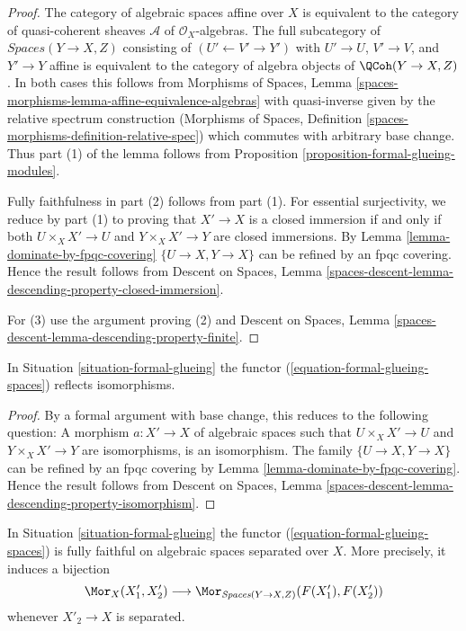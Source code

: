 \begin{proof}
The category of algebraic spaces affine over $X$ is equivalent to the
category of quasi-coherent sheaves $\mathcal{A}$ of $\mathcal{O}_X$-algebras.
The full subcategory of $\textit{Spaces}(Y \to X, Z)$ consisting of
$(U' \leftarrow V' \rightarrow Y')$ with $U' \to U$, $V' \to V$,
and $Y' \to Y$ affine is equivalent to the category of
algebra objects of $\QCoh(Y \to X, Z)$. In both cases this follows
from Morphisms of Spaces, Lemma
\ref{spaces-morphisms-lemma-affine-equivalence-algebras}
with quasi-inverse given by the relative spectrum construction
(Morphisms of Spaces, Definition
\ref{spaces-morphisms-definition-relative-spec})
which commutes with arbitrary base change. Thus part (1) of the
lemma follows from Proposition \ref{proposition-formal-glueing-modules}.

\medskip\noindent
Fully faithfulness in part (2) follows from part (1). For essential
surjectivity, we reduce by part (1) to proving that $X' \to X$
is a closed immersion if and only if both $U \times_X X' \to U$ and
$Y \times_X X' \to Y$ are closed immersions. By
Lemma \ref{lemma-dominate-by-fpqc-covering}
$\{U \to X, Y \to X\}$ can be refined by an fpqc covering.
Hence the result follows from
Descent on Spaces, Lemma
\ref{spaces-descent-lemma-descending-property-closed-immersion}.

\medskip\noindent
For (3) use the argument proving (2) and
Descent on Spaces, Lemma
\ref{spaces-descent-lemma-descending-property-finite}.
\end{proof}

\begin{lemma}
\label{lemma-reflects-isomorphisms}
In Situation \ref{situation-formal-glueing} the functor
(\ref{equation-formal-glueing-spaces}) reflects isomorphisms.
\end{lemma}

\begin{proof}
By a formal argument with base change, this reduces to the following
question: A morphism $a : X' \to X$ of algebraic spaces such that
$U \times_X X' \to U$ and $Y \times_X X' \to Y$ are isomorphisms, is
an isomorphism. The family $\{U \to X, Y \to X\}$ can be refined by
an fpqc covering by Lemma \ref{lemma-dominate-by-fpqc-covering}.
Hence the result follows from
Descent on Spaces, Lemma
\ref{spaces-descent-lemma-descending-property-isomorphism}.
\end{proof}

\begin{lemma}
\label{lemma-fully-faithful-on-separated}
In Situation \ref{situation-formal-glueing} the functor
(\ref{equation-formal-glueing-spaces}) is fully faithful
on algebraic spaces separated over $X$. More precisely, it induces
a bijection
$$
\Mor_X(X'_1, X'_2)
\longrightarrow
\Mor_{\textit{Spaces}(Y \to X, Z)}(F(X'_1), F(X'_2))
$$
whenever $X'_2 \to X$ is separated.
\end{lemma}

